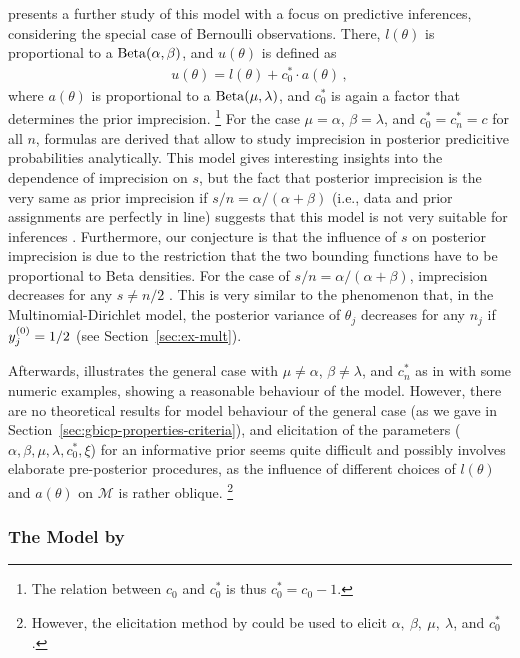 
\textcite{1994:coolen} presents a further study of this model with a focus on predictive inferences,
considering the special case of Bernoulli observations.
There, $l(\theta)$ is proportional to a $\operatorname{Beta}(\alpha,\beta)$,
and $u(\theta)$ is defined as
\begin{align*}
u(\theta) = l(\theta) + c^*_0 \cdot a(\theta)\,,
\end{align*}
where $a(\theta)$ is proportional to a $\operatorname{Beta}(\mu,\lambda)$,
and $c^*_0$ is again a factor that determines the prior imprecision.%
\footnote{The relation between $c_0$ and $c^*_0$ is thus $c^*_0 = c_0 - 1$.}
For the case $\mu=\alpha$, $\beta=\lambda$, and $c^*_0 = c^*_n = c$ for all $n$,
formulas are derived that allow to study
imprecision in posterior predicitive probabilities analytically.
This model gives interesting insights into the dependence of imprecision on $s$,
but the fact that posterior imprecision is the very same as prior imprecision
if $s/n = \alpha/(\alpha+\beta)$ (i.e., data and prior assignments are perfectly in line)
suggests that this model is not very suitable for inferences \parencite[p.~160]{1994:coolen}.
Furthermore, our conjecture is that the influence of $s$ on posterior imprecision
is due to the restriction that the two bounding functions have to be
proportional to Beta densities. For the case of $s/n = \alpha/(\alpha+\beta)$,
imprecision decreases for any $s \neq n/2$ \parencite[Table~1]{1994:coolen}.
This is very similar to the phenomenon that, in the Multinomial-Dirichlet model,
the posterior variance of $\theta_j$ decreases for any $n_j$ if $y^{(0)}_j = 1/2$
(see Section~\ref{sec:ex-mult}).

Afterwards, \textcite[\S 4]{1994:coolen} illustrates the general case
with $\mu\neq\alpha$, $\beta\neq\lambda$, and $c^*_n$ as in \textcite{1993:coolen}
with some numeric examples, showing a reasonable behaviour of the model.
However, there are no theoretical results for model behaviour of the general case
(as we gave in Section~\ref{sec:gbicp-properties-criteria}),
and elicitation of the parameters ($\alpha,\beta,\mu,\lambda,c^*_0,\xi$)
for an informative prior
seems quite difficult and possibly involves elaborate pre-posterior procedures,
as the influence of different choices of $l(\theta)$ and $a(\theta)$ on $\mathcal{M}$
is rather oblique.%
\footnote{However, the elicitation method by \textcite{2011:rinderknecht} could be used
to elicit $\alpha,\ \beta,\ \mu,\ \lambda$, and $c^*_0$.}


\subsubsection{The Model by \texorpdfstring{\textcite{2009:bickis}}{Bickis (2009)}}
\label{sec:alternatives:bickis}

